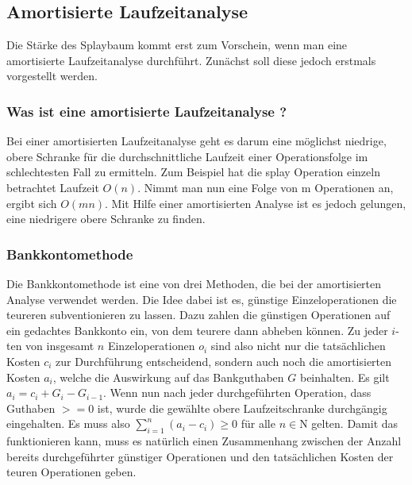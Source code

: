 \documentclass[11pt, a4paper]{article}
\begin{document}
\subsection{Amortisierte Laufzeitanalyse} 
Die Stärke des Splaybaum kommt erst zum Vorschein, wenn man eine amortisierte Laufzeitanalyse durchführt. Zunächst soll diese jedoch erstmals vorgestellt werden.
\subsubsection{Was ist eine amortisierte Laufzeitanalyse ?} 
Bei einer amortisierten Laufzeitanalyse geht es darum  eine möglichst niedrige, obere Schranke für die durchschnittliche Laufzeit einer Operationsfolge im schlechtesten Fall zu ermitteln. Zum Beispiel hat die splay Operation einzeln betrachtet Laufzeit $O(n)$. Nimmt man nun eine Folge von m Operationen an, ergibt sich $O(mn)$. Mit Hilfe einer amortisierten Analyse ist es jedoch gelungen, eine niedrigere obere Schranke zu finden. 

\subsubsection{Bankkontomethode}
Die Bankkontomethode ist eine von drei Methoden, die bei der amortisierten Analyse verwendet werden. Die Idee dabei ist es, günstige Einzeloperationen die teureren subventionieren zu lassen. Dazu zahlen die günstigen Operationen auf ein gedachtes Bankkonto ein, von dem teurere dann abheben können. Zu jeder $i$-ten von insgesamt $n$ Einzeloperationen $o_{i}$ sind also nicht nur die tatsächlichen Kosten $c_{i}$ zur Durchführung entscheidend, sondern auch noch die amortisierten Kosten $a_{i}$, welche die Auswirkung auf das Bankguthaben $G$ beinhalten. Es gilt $a_{i} = c_{i} + G_{i} - G_{i-1}$. Wenn nun nach jeder durchgeführten Operation, dass Guthaben $>=0$ ist, wurde die gewählte obere Laufzeitschranke durchgängig eingehalten. Es muss also $\sum \limits_{i=1}^n (a_{i} - c_{i})  \geq 0$ für alle $n \in \mathrm{N}$ gelten. Damit das funktionieren kann, muss es natürlich einen Zusammenhang zwischen der Anzahl bereits durchgeführter günstiger Operationen und den tatsächlichen Kosten der teuren Operationen geben. 
\end{document}
